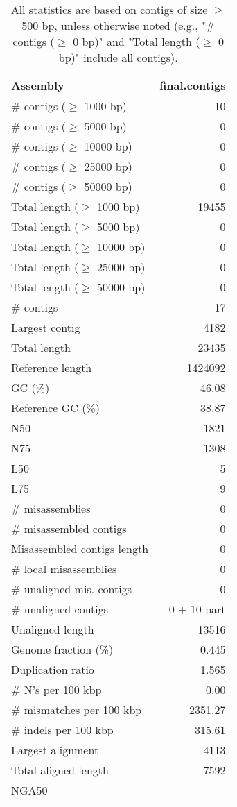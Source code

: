 \documentclass[12pt,a4paper]{article}
\begin{document}
\begin{table}[ht]
\begin{center}
\caption{All statistics are based on contigs of size $\geq$ 500 bp, unless otherwise noted (e.g., "\# contigs ($\geq$ 0 bp)" and "Total length ($\geq$ 0 bp)" include all contigs).}
\begin{tabular}{|l*{1}{|r}|}
\hline
Assembly & final.contigs \\ \hline
\# contigs ($\geq$ 1000 bp) & 10 \\ \hline
\# contigs ($\geq$ 5000 bp) & 0 \\ \hline
\# contigs ($\geq$ 10000 bp) & 0 \\ \hline
\# contigs ($\geq$ 25000 bp) & 0 \\ \hline
\# contigs ($\geq$ 50000 bp) & 0 \\ \hline
Total length ($\geq$ 1000 bp) & 19455 \\ \hline
Total length ($\geq$ 5000 bp) & 0 \\ \hline
Total length ($\geq$ 10000 bp) & 0 \\ \hline
Total length ($\geq$ 25000 bp) & 0 \\ \hline
Total length ($\geq$ 50000 bp) & 0 \\ \hline
\# contigs & 17 \\ \hline
Largest contig & 4182 \\ \hline
Total length & 23435 \\ \hline
Reference length & 1424092 \\ \hline
GC (\%) & 46.08 \\ \hline
Reference GC (\%) & 38.87 \\ \hline
N50 & 1821 \\ \hline
N75 & 1308 \\ \hline
L50 & 5 \\ \hline
L75 & 9 \\ \hline
\# misassemblies & 0 \\ \hline
\# misassembled contigs & 0 \\ \hline
Misassembled contigs length & 0 \\ \hline
\# local misassemblies & 0 \\ \hline
\# unaligned mis. contigs & 0 \\ \hline
\# unaligned contigs & 0 + 10 part \\ \hline
Unaligned length & 13516 \\ \hline
Genome fraction (\%) & 0.445 \\ \hline
Duplication ratio & 1.565 \\ \hline
\# N's per 100 kbp & 0.00 \\ \hline
\# mismatches per 100 kbp & 2351.27 \\ \hline
\# indels per 100 kbp & 315.61 \\ \hline
Largest alignment & 4113 \\ \hline
Total aligned length & 7592 \\ \hline
NGA50 & - \\ \hline
\end{tabular}
\end{center}
\end{table}
\end{document}
